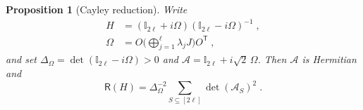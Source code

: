 \documentclass[prx,twocolumn,superscriptaddress,aps,10pt, frontmatterverbose, reprint,footinbib,longbibliography=true]{revtex4-2}
\newtheorem{proposition}{Proposition}
\newcommand{\trans}{\mathsf{T}}
\begin{document}
\begin{proposition}[Cayley reduction]
\label{prop:Cayley}
Write
\begin{equation}
\begin{split}
    H&=(\mathbb{I}_{2\ell}+i\Omega)(\mathbb{I}_{2\ell}-i\Omega)^{-1}\;,\\ \Omega&=O\Big(\bigoplus_{j=1}^{\ell}\lambda_jJ\Big)O^{\trans}\;,
    \label{eq:H-Cayley}
\end{split}
\end{equation}
and set $\Delta_\Omega=\det(\mathbb{I}_{2\ell}-i\Omega)>0$ and $\mathcal{A}=\mathbb{I}_{2\ell}+i\sqrt2\,\Omega$. Then $\mathcal{A}$ is Hermitian and
\begin{equation}
    \mathsf{R}(H)=\Delta_\Omega^{-2}\sum_{S\subseteq[2\ell]}\det(\mathcal{A}_S)^2\;.
    \label{eq:Cayley-reduction}
\end{equation}
\end{proposition}
\end{document}
